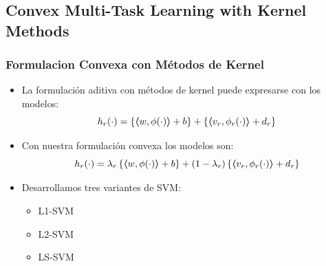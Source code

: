 \documentclass{beamer}
\newcommand{\dotp}[2]{\bm{\left\langle} #1, #2 \bm{\right\rangle}}
\begin{document}
\subsection{Convex Multi-Task Learning with Kernel Methods}

\begin{frame}
      \frametitle{Formulacion Convexa con Métodos de Kernel}

      \begin{itemize}
            \item La formulación aditiva con métodos de kernel puede expresarse con los modelos:
            \begin{equation}
                  \nonumber
                  h_r(\cdot) = \left\lbrace \dotp{w}{\phi(\cdot)} + b  \right\rbrace + \left\lbrace \dotp{{v}_r}{\phi_r(\cdot)} + d_r \right\rbrace
            \end{equation}
            \item Con nuestra formulación convexa los modelos son:
            \begin{equation}
                  \nonumber
                  h_r(\cdot) = \lambda_r \left\lbrace \dotp{w}{\phi(\cdot)} + b  \right\rbrace + (1 - \lambda_r) \left\lbrace \dotp{{v}_r}{\phi_r(\cdot)} + d_r \right\rbrace
            \end{equation}
            \item Desarrollamos tres variantes de SVM:
            \begin{itemize}
                  \item L1-SVM
                  \item L2-SVM
                  \item LS-SVM
            \end{itemize}
      \end{itemize}

\end{frame}
\end{document}
